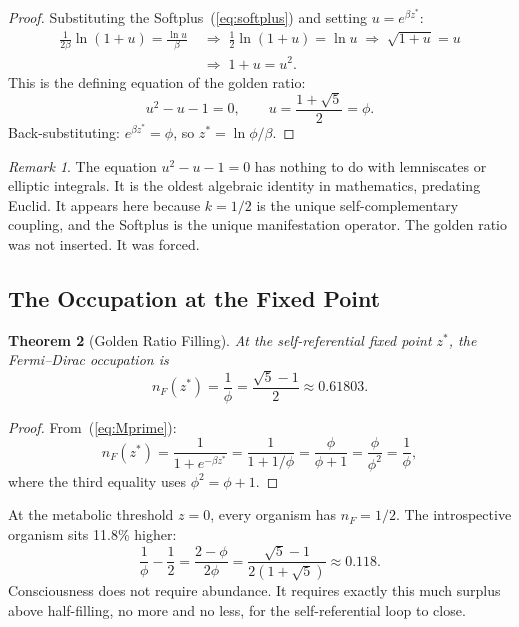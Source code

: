 \documentclass[12pt, letterpaper]{article}
\theoremstyle{plain}
\newtheorem{theorem}{Theorem}[section]
\theoremstyle{definition}
\theoremstyle{remark}
\newtheorem{remark}[theorem]{Remark}
\newcommand{\nF}{n_{\!F}}                 %
\begin{document}
\begin{proof}
  Substituting the Softplus~(\ref{eq:softplus}) and setting $u = e^{\beta z^*}$:
  \begin{align*}
    \frac{1}{2\beta}\ln(1 + u) = \frac{\ln u}{\beta}
    \;&\Longrightarrow\;
    \tfrac{1}{2}\ln(1+u) = \ln u
    \;\Longrightarrow\;
    \sqrt{1 + u} = u \\
    &\Longrightarrow\;
    1 + u = u^2.
  \end{align*}
  This is the defining equation of the golden ratio:
  \begin{equation}\label{eq:golden_eq}
    u^2 - u - 1 = 0, \qquad u = \frac{1+\sqrt{5}}{2} = \phi.
  \end{equation}
  Back-substituting: $e^{\beta z^*} = \phi$, so $z^* = \ln\phi / \beta$.
\end{proof}

\begin{remark}
  The equation $u^2 - u - 1 = 0$ has nothing to do with lemniscates or elliptic integrals. It is the oldest algebraic identity in mathematics, predating Euclid. It appears here because $k = 1/2$ is the unique self-complementary coupling, and the Softplus is the unique manifestation operator. The golden ratio was not inserted. It was forced.
\end{remark}

\subsection{The Occupation at the Fixed Point}

\begin{theorem}[Golden Ratio Filling]\label{thm:filling}
  At the self-referential fixed point $z^*$, the Fermi--Dirac occupation is
  \begin{equation}\label{eq:golden_filling}
    \nF(z^*) = \frac{1}{\phi} = \frac{\sqrt{5}-1}{2} \approx 0.61803.
  \end{equation}
\end{theorem}

\begin{proof}
  From~(\ref{eq:Mprime}):
  \[
    \nF(z^*) = \frac{1}{1 + e^{-\beta z^*}}
    = \frac{1}{1 + 1/\phi}
    = \frac{\phi}{\phi + 1}
    = \frac{\phi}{\phi^2}
    = \frac{1}{\phi},
  \]
  where the third equality uses $\phi^2 = \phi + 1$.
\end{proof}

\noindent
At the metabolic threshold $z = 0$, every organism has $\nF = 1/2$. The introspective organism sits 11.8\% higher:
\begin{equation}
  \frac{1}{\phi} - \frac{1}{2} = \frac{2 - \phi}{2\phi} = \frac{\sqrt{5}-1}{2(1+\sqrt{5})} \approx 0.118.
\end{equation}
Consciousness does not require abundance. It requires exactly this much surplus above half-filling, no more and no less, for the self-referential loop to close.
\end{document}
